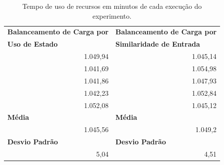 









\begin{table}[h!]
\centering
\caption{Tempo de uso de recursos em minutos de cada execução do experimento.}
\begin{tabular}{rr}
\multicolumn{1}{l}{\textbf{Balanceamento de Carga por}} & \multicolumn{1}{l}{\textbf{Balanceamento de Carga por}}  \\
\multicolumn{1}{l}{\textbf{Uso de Estado}} & \multicolumn{1}{l}{\textbf{Similaridade de Entrada}}  \\
 1.049,94 & 1.045,14  \\
1.041,69  & 1.054,98 \\
1.041,86  & 1.047,93 \\
1.042,23  & 1.052,84  \\
1.052,08  & 1.045,12  \\
\multicolumn{1}{l}{\textbf{Média}}& \multicolumn{1}{l}{\textbf{Média}} \\
1.045,56  & 1.049,2  \\
\multicolumn{1}{l}{\textbf{Desvio Padrão}} & \multicolumn{1}{l}{\textbf{Desvio Padrão}}  \\
 5,04 & 4,51                         
\end{tabular}
\label{Tab:time_and_avg}
\end{table}

